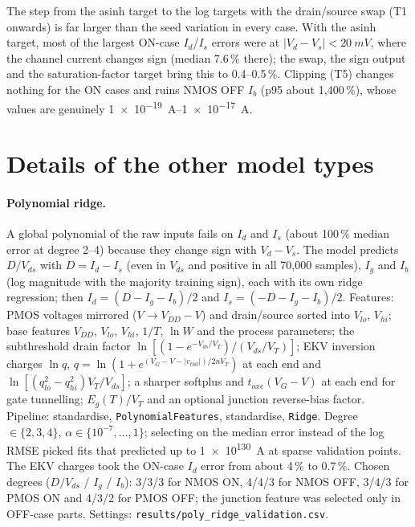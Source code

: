 \documentclass[11pt,a4paper]{article}
\begin{document}
The step from the asinh target to the log targets with the drain/source swap (T1 onwards) is far larger
than the seed variation in every case. With the asinh target, most of the largest ON-case $I_d$/$I_s$
errors were at $|V_d - V_s| < \SI{20}{mV}$, where the channel current changes sign (median 7.6\,\% there);
the swap, the sign output and the saturation-factor target bring this to 0.4--0.5\,\%. Clipping (T5)
changes nothing for the ON cases and ruins NMOS OFF $I_b$ (p95 about 1{,}400\,\%), whose values are
genuinely \SIrange{1e-19}{1e-17}{A}.

\section{Details of the other model types}
\label{app:other}
\paragraph{Polynomial ridge.} A global polynomial of the raw inputs fails on $I_d$ and $I_s$ (about
100\,\% median error at degree 2--4) because they change sign with $V_d - V_s$. The model predicts
$D/V_{ds}$ with $D = I_d - I_s$ (even in $V_{ds}$ and positive in all 70{,}000 samples), $I_g$ and $I_b$
(log magnitude with the majority training sign), each with its own ridge regression; then
$I_d = (D - I_g - I_b)/2$ and $I_s = (-D - I_g - I_b)/2$. Features: PMOS voltages mirrored
($V \to V_{DD} - V$) and drain/source sorted into $V_{lo}$, $V_{hi}$; base features $V_{DD}$, $V_{lo}$,
$V_{hi}$, $1/T$, $\ln W$ and the process parameters; the subthreshold drain factor
$\ln[(1-e^{-V_{ds}/V_T})/(V_{ds}/V_T)]$; EKV inversion charges $\ln q$,
$q=\ln(1+e^{(V_G - V - |v_{th0}|)/2nV_T})$ at each end and $\ln[(q_{lo}^2-q_{hi}^2)V_T/V_{ds}]$; a sharper
softplus and $t_{oxe}(V_G - V)$ at each end for gate tunnelling; $E_g(T)/V_T$ and an optional junction
reverse-bias factor. Pipeline: standardise, \texttt{PolynomialFeatures}, standardise, \texttt{Ridge}.
Degree $\in\{2,3,4\}$, $\alpha \in \{10^{-7},\dots,1\}$; selecting on the median error instead of the log
RMSE picked fits that predicted up to \SI{1e130}{A} at sparse validation points. The EKV charges took the
ON-case $I_d$ error from about 4\,\% to 0.7\,\%. Chosen degrees ($D/V_{ds}$ / $I_g$ / $I_b$): 3/3/3 for NMOS ON,
4/4/3 for NMOS OFF, 3/4/3 for PMOS ON and 4/3/2 for PMOS OFF; the junction feature was selected only in
OFF-case parts. Settings: \texttt{results/poly\_ridge\_validation.csv}.
\end{document}
